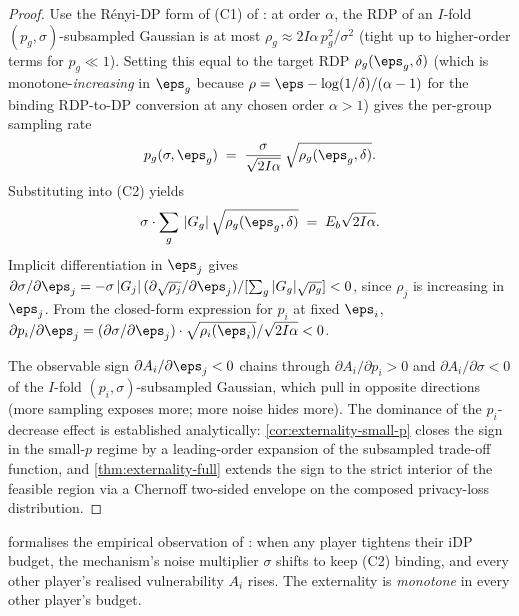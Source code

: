 \begin{proof}
Use the R\'enyi-DP form of (C1) of \citet{mironov2017renyi}: at order
$\alpha$, the RDP of an $I$-fold $(p_g,\sigma)$-subsampled Gaussian is at
most $\rho_g \approx 2I\alpha\, p_g^2/\sigma^2$ (tight up to higher-order
terms for $p_g \ll 1$). Setting this equal to the target RDP
$\rho_g(\eps_g, \delta)$ (which is monotone-\emph{increasing} in $\eps_g$
because $\rho = \eps - \log(1/\delta)/(\alpha-1)$ for the binding RDP-to-DP
conversion at any chosen order $\alpha > 1$) gives the per-group sampling
rate
\[
p_g(\sigma, \eps_g) \;=\; \frac{\sigma}{\sqrt{2I\alpha}}\,
\sqrt{\rho_g(\eps_g, \delta)}.
\]
Substituting into (C2) yields
\begin{equation}
\sigma \cdot \sum_{g}\, |G_g|\, \sqrt{\rho_g(\eps_g,\delta)} \;=\; E_b
\sqrt{2I\alpha}.
\label{eq:sigma-implicit}
\end{equation}
Implicit differentiation in $\eps_j$ gives
$\partial \sigma / \partial \eps_j = -\sigma\, |G_j|\, (\partial \sqrt{\rho_j}
/ \partial \eps_j) / [\sum_g |G_g|\sqrt{\rho_g}] < 0$, since
$\rho_j$ is increasing in $\eps_j$. From the closed-form expression for
$p_i$ at fixed $\eps_i$, $\partial p_i / \partial \eps_j = (\partial \sigma /
\partial \eps_j) \cdot \sqrt{\rho_i(\eps_i)}/\sqrt{2I\alpha} < 0$.

The observable sign $\partial A_i / \partial \eps_j < 0$ chains through
$\partial A_i / \partial p_i > 0$ and $\partial A_i / \partial \sigma < 0$
of the $I$-fold $(p_i,\sigma)$-subsampled Gaussian, which pull in
opposite directions (more sampling exposes more; more noise hides more).
The dominance of the $p_i$-decrease effect is established analytically:
\cref{cor:externality-small-p} closes the sign in the small-$p$ regime by
a leading-order expansion of the subsampled trade-off function, and
\cref{thm:externality-full} extends the sign to the strict interior of
the feasible region via a Chernoff two-sided envelope on the composed
privacy-loss distribution.
\end{proof}

 formalises the empirical observation of
\citet{kaiser2026your}: when any player tightens their iDP budget, the
mechanism's noise multiplier $\sigma$ shifts to keep (C2) binding, and every
other player's realised vulnerability $A_i$ rises. The externality is
\emph{monotone} in every other player's budget.

